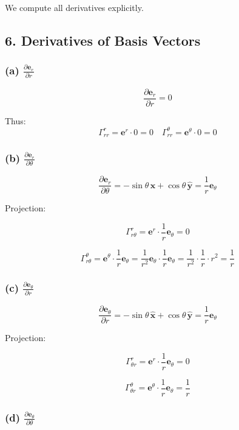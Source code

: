 \documentclass{article}
\begin{document}
	We compute all derivatives explicitly.
	
	\subsection*{6. Derivatives of Basis Vectors}
	
	\subsubsection*{(a) $\frac{\partial \mathbf{e}_r}{\partial r}$}
	
	\[
	\frac{\partial \mathbf{e}_r}{\partial r} = 0
	\]
	
	Thus:
	\[
	\Gamma^r_{rr} = \mathbf{e}^r\cdot 0 = 0
	\quad
	\Gamma^\theta_{rr} = \mathbf{e}^\theta\cdot 0 = 0
	\]
	
	\subsubsection*{(b) $\frac{\partial \mathbf{e}_r}{\partial \theta}$}
	
	\[
	\frac{\partial \mathbf{e}_r}{\partial \theta}
	= -\sin\theta\,\hat{\mathbf{x}} + \cos\theta\,\hat{\mathbf{y}}
	= \frac{1}{r}\mathbf{e}_\theta
	\]
	
	Projection:
	
	\[
	\Gamma^r_{r\theta}
	= \mathbf{e}^r \cdot \frac{1}{r}\mathbf{e}_\theta = 0
	\]
	
	\[
	\Gamma^\theta_{r\theta}
	=
	\mathbf{e}^\theta \cdot \frac{1}{r}\mathbf{e}_\theta
	=
	\frac{1}{r^2}\mathbf{e}_\theta \cdot \frac{1}{r}\mathbf{e}_\theta
	=
	\frac{1}{r^2} \cdot \frac{1}{r} \cdot r^2
	= \frac{1}{r}
	\]
	
	\subsubsection*{(c) $\frac{\partial \mathbf{e}_\theta}{\partial r}$}
	
	\[
	\frac{\partial \mathbf{e}_\theta}{\partial r}
	= -\sin\theta\,\hat{\mathbf{x}} + \cos\theta\,\hat{\mathbf{y}}
	= \frac{1}{r}\mathbf{e}_\theta
	\]
	
	Projection:
	
	\[
	\Gamma^r_{\theta r}
	= \mathbf{e}^r \cdot \frac{1}{r}\mathbf{e}_\theta = 0
	\]
	
	\[
	\Gamma^\theta_{\theta r}
	=
	\mathbf{e}^\theta \cdot \frac{1}{r}\mathbf{e}_\theta
	= \frac{1}{r}
	\]
	
	\subsubsection*{(d) $\frac{\partial \mathbf{e}_\theta}{\partial \theta}$}
	
\end{document}
